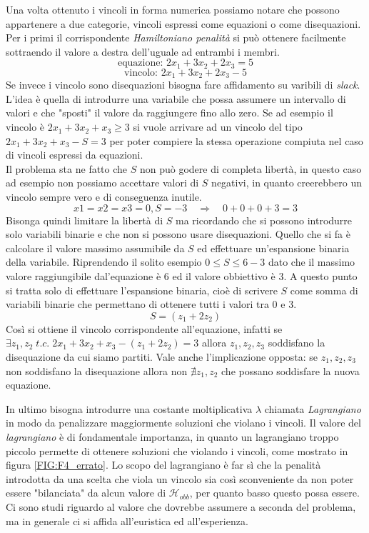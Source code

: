 \documentclass[a4paper]{article}
\begin{document}
Una volta ottenuto i vincoli in forma numerica possiamo notare che possono appartenere a due categorie, vincoli espressi come equazioni o come disequazioni.\\
Per i primi il corrispondente \textit{Hamiltoniano penalità} si può ottenere facilmente sottraendo il valore a destra dell'uguale ad entrambi i membri.
$$\text{equazione: } 2x_1 + 3x_2 + 2x_3 = 5 $$
$$\text{vincolo: } 2x_1 + 3x_2 + 2x_3 -5 $$
Se invece i vincolo sono disequazioni bisogna fare affidamento su varibili di \textit{slack}.\\
L'idea è quella di introdurre una variabile che possa assumere un intervallo di valori e che "sposti" il valore da raggiungere fino allo zero.
Se ad esempio il vincolo è $2x_1 + 3x_2 + x_3 \geq 3 $ si vuole arrivare ad un vincolo del tipo $2x_1 + 3x_2 + x_3 - S =3 $ per poter compiere la stessa operazione compiuta nel caso di vincoli espressi da equazioni.\\
Il problema sta ne fatto che $S$ non può godere di completa libertà, in questo caso ad esempio non possiamo accettare valori di $S$ negativi, in quanto creerebbero un vincolo sempre vero e di conseguenza inutile.
$$ x1=x2=x3=0, S= -3 \quad \Rightarrow \quad 0 + 0 + 0 + 3 = 3 $$
Bisonga quindi limitare la libertà di $S$ ma ricordando che si possono introdurre solo variabili binarie e che non si possono usare disequazioni.
Quello che si fa è calcolare il valore massimo assumibile da $S$ ed effettuare un'espansione binaria della variabile.
Riprendendo il solito esempio $0 \leq S \leq 6-3$ dato che il massimo valore raggiungibile dal'equazione è 6 ed il valore obbiettivo è 3.
A questo punto si tratta solo di effettuare l'espansione binaria, cioè di scrivere $S$ come somma di variabili binarie che permettano di ottenere tutti i valori tra 0 e 3.
$$ S = (z_1 + 2z_2) $$
Così si ottiene il vincolo corrispondente all'equazione, infatti se $\exists z_1,z_2 \; t.c. \; 2x_1 + 3x_2 + x_3 - (z_1 + 2z_2)=3 $ allora $z_1,z_2,z_3$ soddisfano la disequazione da cui siamo partiti.
Vale anche l'implicazione opposta: se $z_1,z_2,z_3$ non soddisfano la disequazione allora non $\nexists z_1,z_2$ che possano soddisfare la nuova equazione.

In ultimo bisogna introdurre una costante moltiplicativa $\lambda$ chiamata \textit{Lagrangiano} in modo da penalizzare maggiormente soluzioni che violano i vincoli.
Il valore del \textit{lagrangiano} è di fondamentale importanza, in quanto un lagrangiano troppo piccolo permette di ottenere soluzioni che violando i vincoli, come mostrato in figura \ref{FIG:F4_errato}. %
Lo scopo del lagrangiano è far sì che la penalità introdotta da una scelta che viola un vincolo sia così sconveniente da non poter essere "bilanciata" da alcun valore di $\mathcal{H}_{obb}$, per quanto basso questo possa essere.
Ci sono studi riguardo al valore che dovrebbe assumere a seconda del problema, ma in generale ci si affida all'euristica ed all'esperienza.
\end{document}
